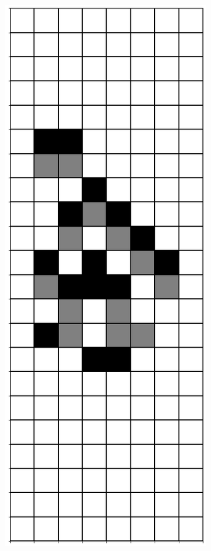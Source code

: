 \documentclass[12pt]{article}
\numberwithin{figure}{section} %
\begin{document}
\begin{figure}[H]
\begin{subfigure}{0.19\textwidth}
     \subcaption{}
   \end{subfigure}
           \begin{subfigure}{0.19\textwidth}
     \centering
     \includegraphics[width=\linewidth]{Section4/28.4}

\end{subfigure}
\end{figure}
\end{document}
